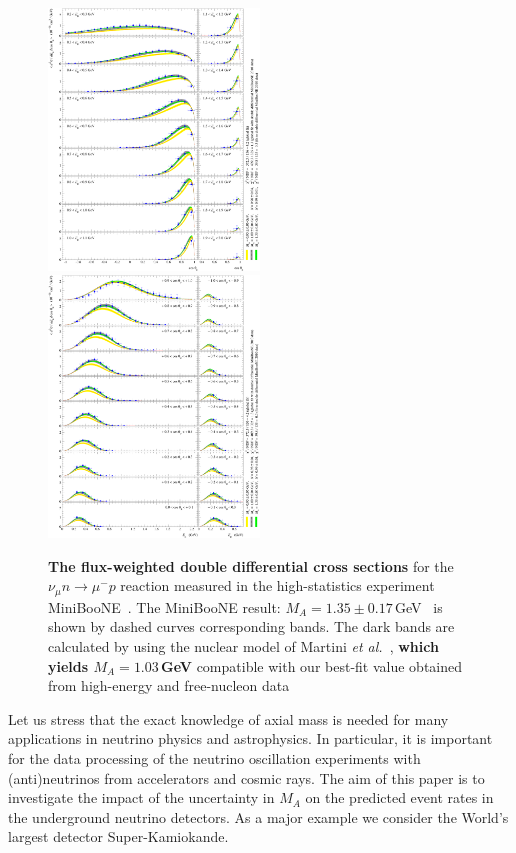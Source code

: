 \begin{figure}[htb!]
\includegraphics[width=0.5\textwidth]{./QES/d2sQESCC_dEkdcosT_Arevalo_MiniBooNE10_Ek_2_BBBA25.eps}
\includegraphics[width=0.5\textwidth]{./QES/d2sQESCC_dEkdcosT_Arevalo_MiniBooNE10_cosT_2_BBBA25.eps}
\caption{\label{MiniBooNE}\textbf{The flux-weighted double differential cross sections} for the $\nu_{\mu}n\to\mu^-p$ reaction measured in the high-statistics experiment MiniBooNE~\cite{AguilarArevalo:2010zc}. The MiniBooNE result: $M_{A}=1.35\pm0.17$\,GeV~\cite{AguilarArevalo:2010zc} is shown by dashed curves corresponding bands. The dark bands are calculated by using the nuclear model of Martini \textit{et al.}~\cite{Martini:2011wp}, \textbf{which yields $M_{A}=1.03$\,GeV} compatible with our best-fit value obtained from high-energy and free-nucleon data}
\end{figure}

Let us stress that the exact knowledge of axial mass is needed for many applications in neutrino physics and astrophysics. In particular, it is important for the data processing of the neutrino oscillation experiments with (anti)neutrinos from accelerators and cosmic rays. The aim of this paper is to investigate the impact of the uncertainty in $M_A$ on the predicted event rates in the underground neutrino detectors. As a major example we consider the World's largest detector Super-Kamiokande.
